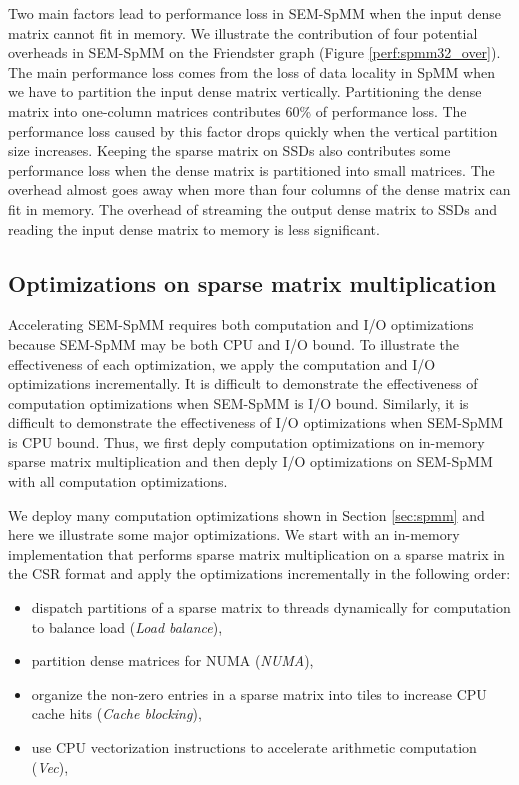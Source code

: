 Two main factors lead to performance loss in SEM-SpMM when the input dense matrix
cannot fit in memory. We illustrate the contribution of four potential overheads
in SEM-SpMM on the Friendster graph (Figure \ref{perf:spmm32_over}). The main
performance loss comes from the loss of data locality in SpMM when we have to
partition the input dense matrix vertically.
Partitioning the dense matrix into one-column matrices contributes 60\%
of performance loss. The performance loss caused by this factor drops quickly
when the vertical partition size increases. Keeping the sparse matrix on SSDs
also contributes some performance loss when the dense matrix is partitioned
into small matrices. The overhead almost goes away when more than four columns
of the dense matrix can fit in memory. The overhead of streaming the output dense
matrix to SSDs and reading the input dense matrix to memory is less significant.

\subsection{Optimizations on sparse matrix multiplication}
Accelerating SEM-SpMM requires both computation and I/O optimizations because
SEM-SpMM may be both CPU and I/O bound. To illustrate the effectiveness of
each optimization, we apply the computation and I/O optimizations
incrementally. It is difficult to demonstrate the effectiveness of computation
optimizations when SEM-SpMM is I/O bound. Similarly, it is difficult to demonstrate
the effectiveness of I/O optimizations when SEM-SpMM is CPU bound. Thus, we first
deply computation optimizations on in-memory sparse matrix multiplication and then
deply I/O optimizations on SEM-SpMM with all computation optimizations.

We deploy many computation optimizations shown in Section \ref{sec:spmm} and
here we illustrate some major optimizations. We start with an in-memory
implementation that
performs sparse matrix multiplication on a sparse matrix in the CSR format
and apply the optimizations incrementally in the following order:
\begin{itemize} \itemsep1pt \parskip0pt 
	\item dispatch partitions of a sparse matrix to threads dynamically for
		computation to balance load (\textit{Load balance}),
	\item partition dense matrices for NUMA (\textit{NUMA}),
	\item organize the non-zero entries in a sparse matrix into tiles to
		increase CPU cache hits (\textit{Cache blocking}),
	\item use CPU vectorization instructions to accelerate arithmetic
		computation (\textit{Vec}),
\end{itemize}

